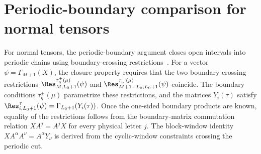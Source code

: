 
\section{Periodic-boundary comparison for normal tensors}\label{sec:normal_boundary_closing}

For normal tensors, the periodic-boundary argument closes open intervals
into periodic chains using boundary-crossing
restrictions~\cite[Section~IV.C]{Cirac2021Matrix}. For a vector $\psi=\Gamma_{M+1}(X)$, the closure property requires that the two
boundary-crossing restrictions
$\Res^{\tau^+_\eta(\mu)}_{M,L_0+1}(\psi)$ and
$\Res^{\tau^-_\eta(\mu)}_{M+1-L_0,L_0+1}(\psi)$ coincide. The
boundary conditions $\tau^\pm_\eta(\mu)$ parametrize these restrictions, and the matrices
$Y_i(\tau)$ satisfy
$\Res^{\tau}_{i,L_0+1}(\psi)=\Gamma_{L_0+1}(Y_i(\tau))$.
Once the one-sided boundary products are known, equality of the restrictions
follows from the boundary-matrix commutation relation $XA^j=A^jX$ for every
physical letter $j$. The block-window identity
$X A^\alpha A^\nu=A^\alpha Y_\nu$ is derived from the cyclic-window constraints
crossing the periodic cut.



